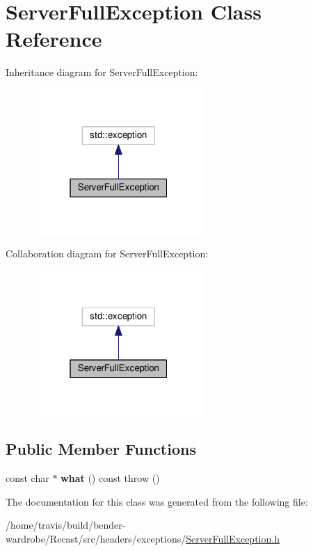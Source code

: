 \hypertarget{class_server_full_exception}{\section{Server\-Full\-Exception Class Reference}
\label{class_server_full_exception}
}


Inheritance diagram for Server\-Full\-Exception\-:
\nopagebreak
\begin{figure}[H]
\begin{center}
\leavevmode
\includegraphics[width=184pt]{class_server_full_exception__inherit__graph}
\end{center}
\end{figure}


Collaboration diagram for Server\-Full\-Exception\-:
\nopagebreak
\begin{figure}[H]
\begin{center}
\leavevmode
\includegraphics[width=184pt]{class_server_full_exception__coll__graph}
\end{center}
\end{figure}
\subsection*{Public Member Functions}
\begin{DoxyCompactItemize}
\item 
\hypertarget{class_server_full_exception_a73652eba4a5b4d724a3fecc4f4c87124}{const char $\ast$ {\bfseries what} () const   throw ()}\label{class_server_full_exception_a73652eba4a5b4d724a3fecc4f4c87124}

\end{DoxyCompactItemize}


The documentation for this class was generated from the following file\-:\begin{DoxyCompactItemize}
\item 
/home/travis/build/bender-\/wardrobe/\-Recast/src/headers/exceptions/\hyperlink{_server_full_exception_8h}{Server\-Full\-Exception.\-h}\end{DoxyCompactItemize}
